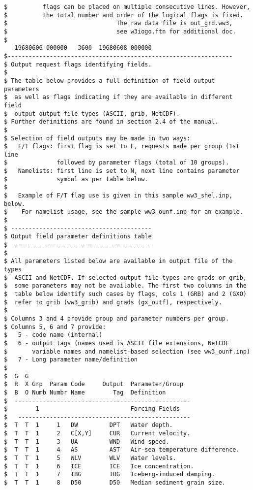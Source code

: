 \begin{footnotesize}
\begin{verbatim}
$          flags can be placed on multiple consecutive lines. However,
$          the total number and order of the logical flags is fixed.
$                               The raw data file is out_grd.ww3, 
$                               see w3iogo.ftn for additional doc.
$
   19680606 000000   3600  19680608 000000
$----------------------------------------------------------------
$ Output request flags identifying fields.
$ 
$ The table below provides a full definition of field output parameters
$  as well as flags indicating if they are available in different field 
$  output output file types (ASCII, grib, NetCDF). 
$ Further definitions are found in section 2.4 of the manual. 
$
$ Selection of field outputs may be made in two ways: 
$   F/T flags: first flag is set to F, requests made per group (1st line
$              followed by parameter flags (total of 10 groups).
$   Namelists: first line is set to N, next line contains parameter 
$              symbol as per table below.
$ 
$   Example of F/T flag use is given in this sample ww3_shel.inp, below.
$    For namelist usage, see the sample ww3_ounf.inp for an example.
$
$ ----------------------------------------
$ Output field parameter definitions table
$ ----------------------------------------
$
$ All parameters listed below are available in output file of the types
$  ASCII and NetCDF. If selected output file types are grads or grib, 
$  some parameters may not be available. The first two columns in the
$  table below identify such cases by flags, cols 1 (GRB) and 2 (GXO)
$  refer to grib (ww3_grib) and grads (gx_outf), respectively.
$
$ Columns 3 and 4 provide group and parameter numbers per group.
$ Columns 5, 6 and 7 provide:
$   5 - code name (internal)
$   6 - output tags (names used is ASCII file extensions, NetCDF 
$       variable names and namelist-based selection (see ww3_ounf.inp)
$   7 - Long parameter name/definition
$
$  G  G
$  R  X Grp  Param Code     Output  Parameter/Group
$  B  O Numb Numbr Name        Tag  Definition 
$  --------------------------------------------------
$        1                          Forcing Fields
$   -------------------------------------------------
$  T  T  1     1   DW         DPT   Water depth.
$  T  T  1     2   C[X,Y]     CUR   Current velocity.
$  T  T  1     3   UA         WND   Wind speed.
$  T  T  1     4   AS         AST   Air-sea temperature difference.
$  T  T  1     5   WLV        WLV   Water levels.
$  T  T  1     6   ICE        ICE   Ice concentration.
$  T  T  1     7   IBG        IBG   Iceberg-induced damping.
$  T  T  1     8   D50        D50   Median sediment grain size.

\end{verbatim}
\end{footnotesize}
